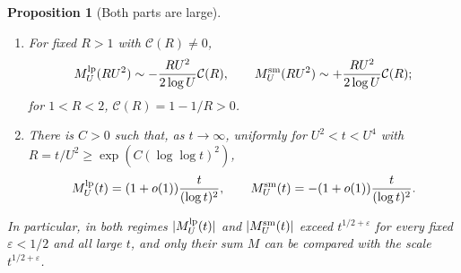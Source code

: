 \documentclass[11pt]{amsart}
\numberwithin{equation}{section}
\theoremstyle{plain}
\newtheorem{proposition}[theorem]{Proposition}
\theoremstyle{definition}
\theoremstyle{remark}
\newcommand{\eps}{\varepsilon}
\newcommand{\Cc}{\mathcal{C}}
\begin{document}
\begin{proposition}[Both parts are large]
\label{prop:both_parts_large}
\begin{enumerate}[label=\textup{(\roman*)}]
\item For fixed $R>1$ with $\Cc(R)\ne0$,
\begin{equation}
\label{eq:E_fixed_R_size}
  M^{\rm lp}_U(RU^2)\sim-\frac{RU^2}{2\log U}\Cc(R),\qquad
  M^{\rm sm}_U(RU^2)\sim+\frac{RU^2}{2\log U}\Cc(R);
\end{equation}
for $1<R<2$, $\Cc(R)=1-1/R>0$.
\item There is $C>0$ such that, as $t\to\infty$, uniformly for $U^2<t<U^4$
with $R=t/U^2\ge\exp(C(\log\log t)^2)$,
\begin{equation}
\label{eq:E_log2}
  M^{\rm lp}_U(t)=(1+o(1))\frac{t}{(\log t)^2},\qquad
  M^{\rm sm}_U(t)=-(1+o(1))\frac{t}{(\log t)^2}.
\end{equation}
\end{enumerate}
In particular, in both regimes $|M^{\rm lp}_U(t)|$ and $|M^{\rm sm}_U(t)|$ exceed
$t^{1/2+\eps}$ for every fixed $\eps<1/2$ and all large $t$, and only their
sum $M$ can be compared with the scale $t^{1/2+\eps}$.
\end{proposition}
\end{document}
